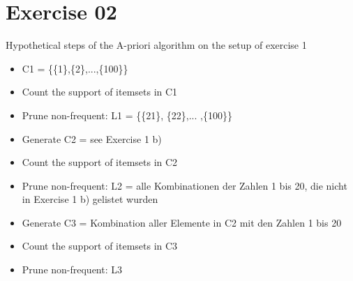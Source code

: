 \documentclass[11pt,a4paper]{scrartcl}
\begin{document}
\section*{Exercise 02}
Hypothetical steps of the A-priori algorithm on the setup of exercise 1
\begin{itemize}
	\item C1 = \{\{1\},\{2\},...,\{100\}\}
	\item Count the support of itemsets in C1
	\item Prune non-frequent: L1 = \{\{21\}, \{22\},... ,\{100\}\}
	\item Generate C2 = see Exercise 1 b)
	\item Count the support of itemsets in C2
	\item Prune non-frequent: L2 = alle Kombinationen der Zahlen 1 bis 20, die nicht in Exercise 1 b) gelistet wurden
	\item Generate C3 = Kombination aller Elemente in C2 mit den Zahlen 1 bis 20
	\item Count the support of itemsets in C3
	\item Prune non-frequent: L3
\end{itemize}
\end{document}
